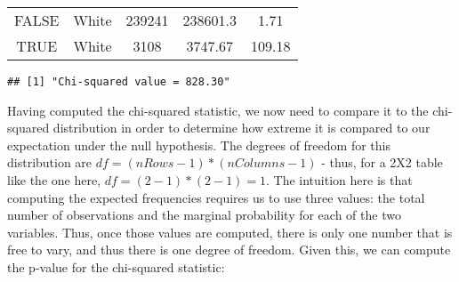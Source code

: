 \documentclass[]{book}
\newenvironment{Shaded}{\begin{snugshade}}{\end{snugshade}}
\newcommand{\KeywordTok}[1]{\textcolor[rgb]{0.13,0.29,0.53}{\textbf{#1}}}
\newcommand{\StringTok}[1]{\textcolor[rgb]{0.31,0.60,0.02}{#1}}
\newcommand{\CommentTok}[1]{\textcolor[rgb]{0.56,0.35,0.01}{\textit{#1}}}
\newcommand{\OperatorTok}[1]{\textcolor[rgb]{0.81,0.36,0.00}{\textbf{#1}}}
\newcommand{\NormalTok}[1]{#1}
\theoremstyle{definition}
\theoremstyle{definition}
\theoremstyle{definition}
\theoremstyle{remark}
\begin{document}
\begin{longtable}[]{@{}ccccc@{}}
\begin{minipage}[t]{0.13\columnwidth}\centering\strut
FALSE\strut
\end{minipage} & \begin{minipage}[t]{0.17\columnwidth}\centering\strut
White\strut
\end{minipage} & \begin{minipage}[t]{0.11\columnwidth}\centering\strut
239241\strut
\end{minipage} & \begin{minipage}[t]{0.13\columnwidth}\centering\strut
238601.3\strut
\end{minipage} & \begin{minipage}[t]{0.13\columnwidth}\centering\strut
1.71\strut
\end{minipage}\tabularnewline
\begin{minipage}[t]{0.13\columnwidth}\centering\strut
TRUE\strut
\end{minipage} & \begin{minipage}[t]{0.17\columnwidth}\centering\strut
White\strut
\end{minipage} & \begin{minipage}[t]{0.11\columnwidth}\centering\strut
3108\strut
\end{minipage} & \begin{minipage}[t]{0.13\columnwidth}\centering\strut
3747.67\strut
\end{minipage} & \begin{minipage}[t]{0.13\columnwidth}\centering\strut
109.18\strut
\end{minipage}\tabularnewline
\bottomrule
\end{longtable}

\begin{Shaded}
\end{Shaded}

\begin{verbatim}
## [1] "Chi-squared value = 828.30"
\end{verbatim}

Having computed the chi-squared statistic, we now need to compare it to
the chi-squared distribution in order to determine how extreme it is
compared to our expectation under the null hypothesis. The degrees of
freedom for this distribution are \(df = (nRows - 1) * (nColumns - 1)\)
- thus, for a 2X2 table like the one here, \(df = (2-1)*(2-1)=1\). The
intuition here is that computing the expected frequencies requires us to
use three values: the total number of observations and the marginal
probability for each of the two variables. Thus, once those values are
computed, there is only one number that is free to vary, and thus there
is one degree of freedom. Given this, we can compute the p-value for the
chi-squared statistic:
\end{document}
